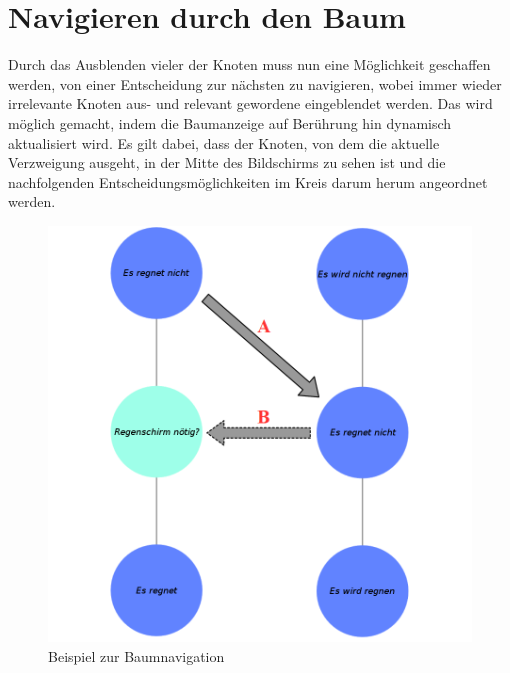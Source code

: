 \section{Navigieren durch den Baum}\label{sec:dynamische_aktual}
Durch das Ausblenden vieler der Knoten muss nun eine Möglichkeit geschaffen werden, von einer Entscheidung zur nächsten zu navigieren, wobei immer wieder irrelevante Knoten aus- und relevant gewordene eingeblendet werden. Das wird möglich gemacht, indem die Baumanzeige auf Berührung hin dynamisch aktualisiert wird. Es gilt dabei, dass der Knoten, von dem die aktuelle Verzweigung ausgeht, in der Mitte des Bildschirms zu sehen ist und die nachfolgenden Entscheidungsmöglichkeiten im Kreis darum herum angeordnet werden.
\begin{figure}
	\centering
	\includegraphics[width=\linewidth]{../screenshots/baumnavigation.PNG}
	\caption{Beispiel zur Baumnavigation}
	\label{abb:baumnavigation}
\end{figure}
